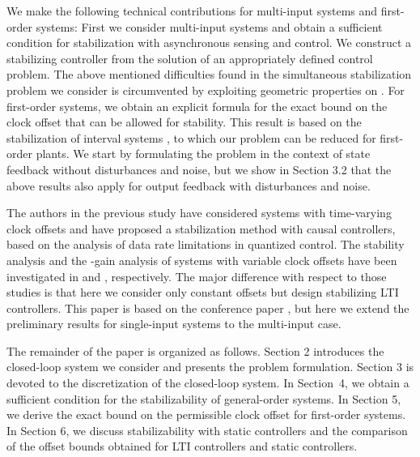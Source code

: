 \documentclass[letterpaper, 12pt, draftcls, onecolumn]{ieeeconf}
\begin{document}
We make the following technical contributions for 
multi-input systems and first-order systems:
First we consider multi-input systems and 
obtain a sufficient condition for stabilization with asynchronous sensing and control.
We construct a stabilizing controller from
the solution of an appropriately defined   control problem.
The above mentioned difficulties found in 
the simultaneous stabilization problem we consider 
is circumvented by exploiting geometric properties on .
For first-order systems,
we obtain
an explicit formula for the exact bound 
on the clock offset that can be allowed for stability.
This result is based on the stabilization of
interval systems \cite{Ghosh1988, Olbrot1994}, 
to which our problem can be reduced for first-order plants.
We start by formulating the problem in the context of state feedback without
disturbances and noise, but we show in Section 3.2 that
the above results also apply for output feedback with disturbances and 
noise.






The authors in the previous study \cite{Okano2015}
have considered systems with time-varying clock offsets
and have
proposed a stabilization method with causal controllers, 
based on the analysis of data rate limitations in quantized control.
The stability analysis and the -gain analysis of systems with variable 
clock offsets have been investigated in \cite{WakaikiCDC2015} and
\cite{Wakaiki2016ACC}, respectively. 
The major difference with respect to those studies is that
here we consider only constant offsets but
design stabilizing LTI controllers. 
This paper is based on the conference paper \cite{Wakaiki2015ACC}, but
here we extend the preliminary results for single-input systems to
the multi-input case.



The remainder of the paper is organized as follows.
Section 2 introduces the closed-loop system we consider 
and presents the problem formulation.
Section 3 is devoted to the discretization of the closed-loop system.
In Section~4, we obtain
a sufficient condition for the stabilizability
of general-order systems.
In Section 5,
we derive the exact bound
on the permissible clock offset for first-order systems. 
In Section 6, we discuss
stabilizability with static controllers and
the comparison of 
the offset bounds obtained for LTI controllers 
and static controllers.
\end{document}
